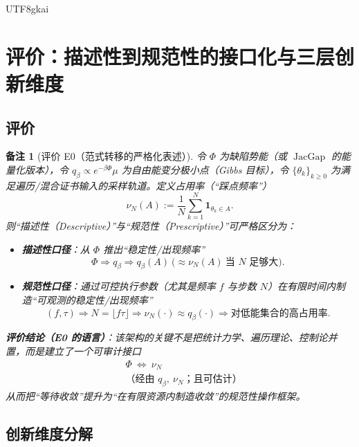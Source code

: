 \documentclass[12pt]{article}
\newtheorem{remark}{备注}[section]
\newcommand{\JacGap}{\operatorname{JacGap}}
\newcommand{\indicator}[1]{\mathbf{1}_{#1}}
\begin{document}
\begin{CJK*}{UTF8}{gkai}
\clearpage

\section{评价：描述性到规范性的接口化与三层创新维度}
\label{sec:tex27-ch23-evaluation-original}

\subsection{评价}
\label{subsec:tex27-ch23-evaluation}

\begin{remark}[评价 E0（范式转移的严格化表述）]
\label{rem:tex27-ch23-e0}
令 $\Phi$ 为缺陷势能（或 $\JacGap$ 的能量化版本），令 $q_\beta\propto e^{-\beta\Phi}\mu$ 为自由能变分极小点（Gibbs 目标），令 $\{\theta_k\}_{k\ge 0}$
  为满足遍历/混合证书输入的采样轨道。定义占用率（“踩点频率”）
\[
  \nu_N(A):=\frac{1}{N}\sum_{k=1}^{N}\indicator{\theta_k\in A}.
\]
则“描述性（Descriptive）”与“规范性（Prescriptive）”可严格区分为：
\begin{itemize}
  \item \textbf{描述性口径}：从 $\Phi$ 推出“稳定性/出现频率”
  \[
    \Phi \Rightarrow q_\beta \Rightarrow q_\beta(A)\ \bigl(\approx \nu_N(A)\ \text{当 }N\text{ 足够大}\bigr).
  \]
  \item \textbf{规范性口径}：通过可控执行参数（尤其是频率 $f$ 与步数 $N$）在有限时间内制造“可观测的稳定性/出现频率”
  \[
    (f,\tau)\Rightarrow N=\lfloor f\tau\rfloor\Rightarrow \nu_N(\cdot)\approx q_\beta(\cdot)\Rightarrow \text{对低能集合的高占用率}
      .
  \]
\end{itemize}
\textbf{评价结论（E0 的语言）}：该架构的关键不是把统计力学、遍历理论、控制论并置，而是建立了一个可审计接口
\[
  \boxed{\begin{aligned}
    &\Phi\ \Longleftrightarrow\ \nu_N\\
    &\text{（经由 }q_\beta,\ \nu_N\text{；且可估计）}
  \end{aligned}}
\]
从而把“等待收敛”提升为“在有限资源内制造收敛”的规范性操作框架。
\end{remark}

\subsection{创新维度分解}
\label{subsec:tex27-ch23-innovation}


\end{CJK*}
\end{document}
